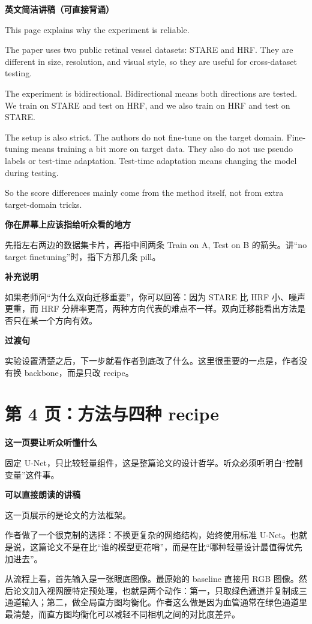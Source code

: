 \documentclass[12pt,a4paper]{ctexart}
\newcommand{\EnglishScriptHeading}{\textbf{\color{AccentGreen}英文简洁讲稿（可直接背诵）}}
\begin{document}
\EnglishScriptHeading

This page explains why the experiment is reliable.

The paper uses two public retinal vessel datasets: STARE and HRF. They are different in size, resolution, and visual style, so they are useful for cross-dataset testing.

The experiment is bidirectional. Bidirectional means both directions are tested. We train on STARE and test on HRF, and we also train on HRF and test on STARE.

The setup is also strict. The authors do not fine-tune on the target domain. Fine-tuning means training a bit more on target data. They also do not use pseudo labels or test-time adaptation. Test-time adaptation means changing the model during testing.

So the score differences mainly come from the method itself, not from extra target-domain tricks.

\textbf{你在屏幕上应该指给听众看的地方}

先指左右两边的数据集卡片，再指中间两条 Train on A, Test on B 的箭头。讲“no target finetuning”时，指下方那几条 pill。

\textbf{补充说明}

如果老师问“为什么双向迁移重要”，你可以回答：因为 STARE 比 HRF 小、噪声更重，而 HRF 分辨率更高，两种方向代表的难点不一样。双向迁移能看出方法是否只在某一个方向有效。

\textbf{过渡句}

实验设置清楚之后，下一步就看作者到底改了什么。这里很重要的一点是，作者没有换 backbone，而是只改 recipe。

\section*{第 4 页：方法与四种 recipe}

\textbf{这一页要让听众听懂什么}

固定 U-Net，只比较轻量组件，这是整篇论文的设计哲学。听众必须听明白“控制变量”这件事。

\textbf{可以直接朗读的讲稿}

这一页展示的是论文的方法框架。

作者做了一个很克制的选择：不换更复杂的网络结构，始终使用标准 U-Net。也就是说，这篇论文不是在比“谁的模型更花哨”，而是在比“哪种轻量设计最值得优先加进去”。

从流程上看，首先输入是一张眼底图像。最原始的 baseline 直接用 RGB 图像。然后论文加入视网膜特定预处理，也就是两个动作：第一，只取绿色通道并复制成三通道输入；第二，做全局直方图均衡化。作者这么做是因为血管通常在绿色通道里最清楚，而直方图均衡化可以减轻不同相机之间的对比度差异。
\end{document}
